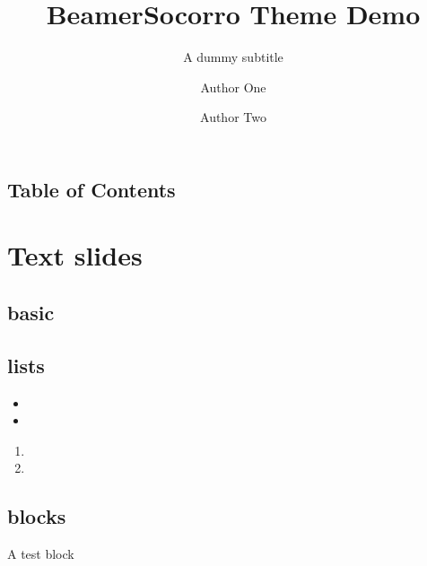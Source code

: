 \documentclass[11pt]{beamer}
\title[Short Title]{BeamerSocorro Theme Demo}
\subtitle{A dummy subtitle}
\author[1,*]{Author One}
\author[2,**]{Author Two}
\affil[1]{Place One}
\affil[2]{Place Two}
\begin{document}
\titleslide

\subsection*{Table of Contents}
\begin{frame}{\secname}
    \tableofcontents
\end{frame}


\section{Text slides}
\subsection{basic}
\begin{frame}{\secname}
    \lipsum[1][1-6]   
    \lipsum[1][1] 
\end{frame}

\subsection{lists}
\begin{frame}{\secname}
    \begin{itemize}
        \item \lipsum[1][1]   
        \item \lipsum[1][2]
    \end{itemize}
    \begin{enumerate}
        \item \lipsum[1][1]   
        \item \lipsum[1][2]
    \end{enumerate}
\end{frame}

\subsection{blocks}
\begin{frame}{\secname}
    \begin{block}{A test block}
        \lipsum[1][1] 
    \end{block}
\end{frame}

\end{document}
